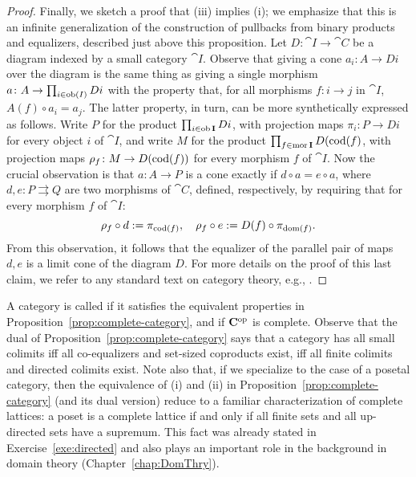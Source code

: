 \begin{proof}
Finally, we sketch a proof that (iii) implies (i); we emphasize that this is an
infinite generalization of the construction of pullbacks from binary products
and equalizers, described just above this proposition. Let $D \colon \cat{I} \to
\cat{C}$ be a diagram indexed by a small category $\cat{I}$. Observe that giving
a cone $a_i \colon A \to Di$ over the diagram is the same thing as giving a
single morphism $a \colon A \to \prod_{i \in \operatorname{\mathrm{ob}}(I)} Di$ with the property that,
for all morphisms $f \colon i \to j$ in $\cat{I}$, $A(f) \circ a_i = a_j$. The
latter property, in turn, can be more synthetically expressed as follows. Write
$P$ for the product $\prod_{i \in \operatorname{\mathrm{ob}} \mathbf{I}} Di$, with projection maps $\pi_i
\colon P \to Di$ for every object $i$ of $\cat{I}$, and write $M$ for the
product $\prod_{f \in \operatorname{\mathrm{mor}} \mathbf{I}} D(\operatorname{\mathrm{cod}}(f)$, with projection maps $\rho_f
\colon M \to D(\operatorname{\mathrm{cod}}(f))$ for every morphism $f$ of $\cat{I}$.  Now the crucial
observation is that $a \colon A \to P$ is a cone exactly if $d \circ a = e \circ
a$, where $d, e \colon P \rightrightarrows Q$ are two morphisms of $\cat{C}$,
defined, respectively, by requiring that for every morphism $f$ of $\cat{I}$:
\[ \rho_f \circ d := \pi_{\operatorname{\mathrm{cod}}(f)}, \quad \rho_f \circ  e := D(f) \circ \pi_{\operatorname{\mathrm{dom}}(f)}.\]
From this observation, it follows that the equalizer of the parallel pair of
maps $d, e$ is a limit cone of the diagram $D$. For more details on the proof of
this last claim, we refer to any standard text on category theory, e.g.,
\cite[Thm.~12.3]{AdaHerStr1990}.  
\end{proof}
A category is called  if it satisfies the equivalent
properties in Proposition~\ref{prop:complete-category}, and
 if $\mathbf{C}^{\mathrm{op}}$ is complete. Observe that the dual of
Proposition~\ref{prop:complete-category} says that a category has all small
colimits iff all co-equalizers and set-sized coproducts exist, iff all finite
colimits and directed colimits exist.  Note also that, if we specialize to the
case of a posetal category, then the equivalence of (i) and (ii) in
Proposition~\ref{prop:complete-category} (and its dual version) reduce to a
familiar characterization of complete lattices: a poset is a complete lattice if
and only if all finite sets and all up-directed sets have a supremum. This fact
was already stated in Exercise~\ref{exe:directed} and also plays an important
role in the background in domain theory (Chapter~\ref{chap:DomThry}).





